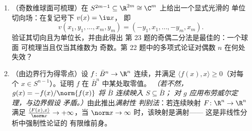 \begin{problem}
\begin{enumerate}[resume]
  \item （奇数维球面可梳理）在 $S^{2m-1}
        \subseteq \R^{2m} \cong \C^m$ 上给出一个显式光滑的
        单位切向场：在复记号下 $v(x) = \iu x$，
        即
        \[
        v(x_1, y_1, \dots, x_m, y_m) =
        (-y_1, x_1, \dots, -y_m, x_m) .
        \]
        验证其切向且为单位长，并由此得出
        第 23 题的奇偶二分法是最佳的：一个球面
        可梳理当且仅当其维数为
        奇数。第
        22 题中的多项式论证对偶数 $n$ 在何处失效？
  \item （由边界行为得零点）设 $f \colon \bar
        B^n \to \R^n$ 连续，并满足 $\langle f(x),
        x\rangle \geq 0$（对每个 $x \in S^{n-1}$）。证明
        $f$ 在 $\bar B^n$ 中某处取零值。
        \emph{（若不然，$g(x) = -f(x)/\norm{f(x)}$ 将
        $\bar B$ 连续映入 $S \subseteq \bar B$；
        对 $g$ 应用布劳威尔定理，与边界假设
        矛盾。）}由此推出\emph{满射性
        判别法}：若连续映射 $F\colon\R^n\to\R^n$ 满足
        $\frac{\langle F(x), x\rangle}{\norm x} \to
        +\infty$，当 $\norm x \to \infty$ 时，该映射是满射——
        这是非线性分析中强制性论证的
        有限维前身。
\end{enumerate}
\end{problem}
